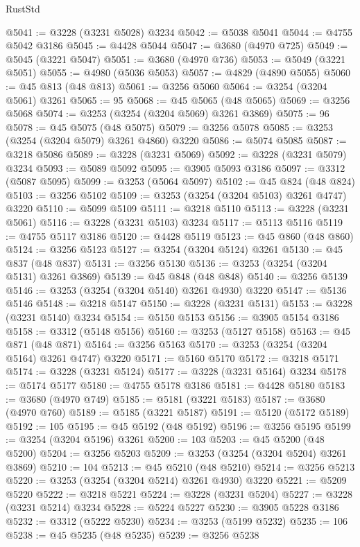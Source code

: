 \begin{lexlean}{RustStd}
\begin{coremodule}
@5041 := @3228 (@3231 @5028) @3234
@5042 := @5038 @5041
@5044 := @4755 @5042 @3186
@5045 := @4428 @5044
@5047 := @3680 (@4970 @725)
@5049 := @5045 (@3221 @5047)
@5051 := @3680 (@4970 @736)
@5053 := @5049 (@3221 @5051)
@5055 := @4980 (@5036 @5053)
@5057 := @4829 (@4890 @5055)
@5060 := @45 @813 (@48 @813)
@5061 := @3256 @5060
@5064 := @3254 (@3204 @5061) @3261
@5065 := 95
@5068 := @45 @5065 (@48 @5065)
@5069 := @3256 @5068
@5074 := @3253 (@3254 (@3204 @5069) @3261 @3869)
@5075 := 96
@5078 := @45 @5075 (@48 @5075)
@5079 := @3256 @5078
@5085 := @3253 (@3254 (@3204 @5079) @3261 @4860) @3220
@5086 := @5074 @5085
@5087 := @3218 @5086
@5089 := @3228 (@3231 @5069)
@5092 := @3228 (@3231 @5079) @3234
@5093 := @5089 @5092
@5095 := @3905 @5093 @3186
@5097 := @3312 (@5087 @5095)
@5099 := @3253 (@5064 @5097)
@5102 := @45 @824 (@48 @824)
@5103 := @3256 @5102
@5109 := @3253 (@3254 (@3204 @5103) @3261 @4747) @3220
@5110 := @5099 @5109
@5111 := @3218 @5110
@5113 := @3228 (@3231 @5061)
@5116 := @3228 (@3231 @5103) @3234
@5117 := @5113 @5116
@5119 := @4755 @5117 @3186
@5120 := @4428 @5119
@5123 := @45 @860 (@48 @860)
@5124 := @3256 @5123
@5127 := @3254 (@3204 @5124) @3261
@5130 := @45 @837 (@48 @837)
@5131 := @3256 @5130
@5136 := @3253 (@3254 (@3204 @5131) @3261 @3869)
@5139 := @45 @848 (@48 @848)
@5140 := @3256 @5139
@5146 := @3253 (@3254 (@3204 @5140) @3261 @4930) @3220
@5147 := @5136 @5146
@5148 := @3218 @5147
@5150 := @3228 (@3231 @5131)
@5153 := @3228 (@3231 @5140) @3234
@5154 := @5150 @5153
@5156 := @3905 @5154 @3186
@5158 := @3312 (@5148 @5156)
@5160 := @3253 (@5127 @5158)
@5163 := @45 @871 (@48 @871)
@5164 := @3256 @5163
@5170 := @3253 (@3254 (@3204 @5164) @3261 @4747) @3220
@5171 := @5160 @5170
@5172 := @3218 @5171
@5174 := @3228 (@3231 @5124)
@5177 := @3228 (@3231 @5164) @3234
@5178 := @5174 @5177
@5180 := @4755 @5178 @3186
@5181 := @4428 @5180
@5183 := @3680 (@4970 @749)
@5185 := @5181 (@3221 @5183)
@5187 := @3680 (@4970 @760)
@5189 := @5185 (@3221 @5187)
@5191 := @5120 (@5172 @5189)
@5192 := 105
@5195 := @45 @5192 (@48 @5192)
@5196 := @3256 @5195
@5199 := @3254 (@3204 @5196) @3261
@5200 := 103
@5203 := @45 @5200 (@48 @5200)
@5204 := @3256 @5203
@5209 := @3253 (@3254 (@3204 @5204) @3261 @3869)
@5210 := 104
@5213 := @45 @5210 (@48 @5210)
@5214 := @3256 @5213
@5220 := @3253 (@3254 (@3204 @5214) @3261 @4930) @3220
@5221 := @5209 @5220
@5222 := @3218 @5221
@5224 := @3228 (@3231 @5204)
@5227 := @3228 (@3231 @5214) @3234
@5228 := @5224 @5227
@5230 := @3905 @5228 @3186
@5232 := @3312 (@5222 @5230)
@5234 := @3253 (@5199 @5232)
@5235 := 106
@5238 := @45 @5235 (@48 @5235)
@5239 := @3256 @5238

\end{coremodule}
\end{lexlean}

